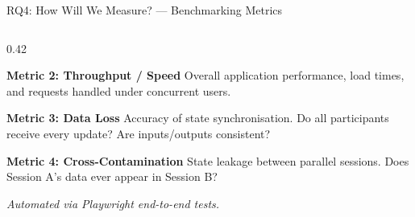 \documentclass[aspectratio=169]{beamer}
\begin{document}
\begin{frame}{RQ4: How Will We Measure? --- Benchmarking Metrics}
\begin{columns}[T]
\begin{column}{0.42\textwidth}
\begin{block}{\textbf{Metric 2: Throughput / Speed}}
\small
Overall application performance, load times, and requests handled under concurrent users.
\end{block}

\begin{block}{\textbf{Metric 3: Data Loss}}
\small
Accuracy of state synchronisation. Do all participants receive every update? Are inputs/outputs consistent?
\end{block}

\begin{block}{\textbf{Metric 4: Cross-Contamination}}
\small
State leakage between parallel sessions. Does Session A's data ever appear in Session B?
\end{block}

\vspace{0.3em}
\small\textit{Automated via Playwright end-to-end tests.}

\end{column}
\end{columns}

\end{frame}
\end{document}
